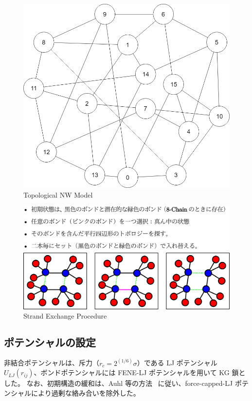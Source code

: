 \documentclass[uplatex,10pt,a4paper,twocolumn]{jsarticle}
\begin{document}
\vspace{-2mm}
\begin{figure}[htb]
	\begin{center}
	\includegraphics[width=.23\textwidth]{Network.png}
	\caption{Topological NW Model}
	\label{fig:topo}
	\end{center}
\end{figure}

\vspace{-8mm}
\begin{figure}[htb]
	\begin{center}
	\includegraphics[width=.42\textwidth]{bond_exchg.png}
	\caption{Strand Exchange Procedure}
	\label{fig:exc}
	\end{center}
\end{figure}
\vspace{-5mm}

\subsection{ポテンシャルの設定}
非結合ポテンシャルは、斥力（$r_c = 2^{(1/6)}\sigma$）である LJ ポテンシャル $U_{LJ}(r_{ij})$、ボンドポテンシャルには FENE-LJ ポテンシャルを用いて KG 鎖とした。
なお、初期構造の緩和は、Auhl 等の方法~\cite{Auhl2003a} に従い、force-capped-LJ ポテンシャルにより過剰な絡み合いを除外した。
\end{document}
